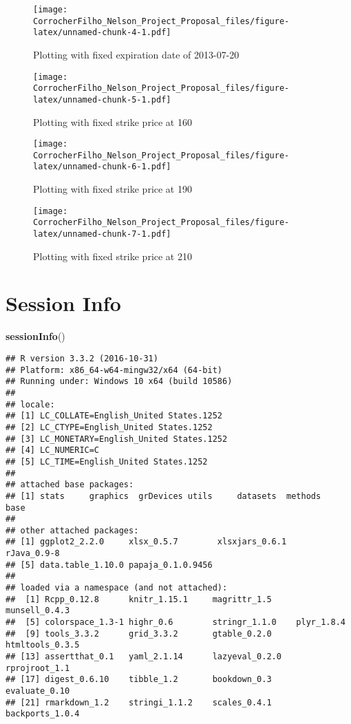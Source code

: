 \documentclass[english,man]{apa6}
\newenvironment{Shaded}{\begin{snugshade}}{\end{snugshade}}
\newcommand{\KeywordTok}[1]{\textcolor[rgb]{0.13,0.29,0.53}{\textbf{{#1}}}}
\newcommand{\NormalTok}[1]{{#1}}
\begin{document}
\begin{figure}[htbp]
\centering
\texttt{[image: CorrocherFilho\_Nelson\_Project\_Proposal\_files/figure-latex/unnamed-chunk-4-1.pdf]}
\caption{\label{fig:unnamed-chunk-4}Plotting with fixed expiration date of
2013-07-20}
\end{figure}

\begin{figure}[htbp]
\centering
\texttt{[image: CorrocherFilho\_Nelson\_Project\_Proposal\_files/figure-latex/unnamed-chunk-5-1.pdf]}
\caption{\label{fig:unnamed-chunk-5}Plotting with fixed strike price at 160}
\end{figure}

\begin{figure}[htbp]
\centering
\texttt{[image: CorrocherFilho\_Nelson\_Project\_Proposal\_files/figure-latex/unnamed-chunk-6-1.pdf]}
\caption{\label{fig:unnamed-chunk-6}Plotting with fixed strike price at 190}
\end{figure}

\begin{figure}[htbp]
\centering
\texttt{[image: CorrocherFilho\_Nelson\_Project\_Proposal\_files/figure-latex/unnamed-chunk-7-1.pdf]}
\caption{\label{fig:unnamed-chunk-7}Plotting with fixed strike price at 210}
\end{figure}

\section{Session Info}\label{session-info}

\begin{Shaded}
\begin{Highlighting}[]
\KeywordTok{sessionInfo}\NormalTok{()}
\end{Highlighting}
\end{Shaded}

\begin{verbatim}
## R version 3.3.2 (2016-10-31)
## Platform: x86_64-w64-mingw32/x64 (64-bit)
## Running under: Windows 10 x64 (build 10586)
## 
## locale:
## [1] LC_COLLATE=English_United States.1252 
## [2] LC_CTYPE=English_United States.1252   
## [3] LC_MONETARY=English_United States.1252
## [4] LC_NUMERIC=C                          
## [5] LC_TIME=English_United States.1252    
## 
## attached base packages:
## [1] stats     graphics  grDevices utils     datasets  methods   base     
## 
## other attached packages:
## [1] ggplot2_2.2.0     xlsx_0.5.7        xlsxjars_0.6.1    rJava_0.9-8      
## [5] data.table_1.10.0 papaja_0.1.0.9456
## 
## loaded via a namespace (and not attached):
##  [1] Rcpp_0.12.8      knitr_1.15.1     magrittr_1.5     munsell_0.4.3   
##  [5] colorspace_1.3-1 highr_0.6        stringr_1.1.0    plyr_1.8.4      
##  [9] tools_3.3.2      grid_3.3.2       gtable_0.2.0     htmltools_0.3.5 
## [13] assertthat_0.1   yaml_2.1.14      lazyeval_0.2.0   rprojroot_1.1   
## [17] digest_0.6.10    tibble_1.2       bookdown_0.3     evaluate_0.10   
## [21] rmarkdown_1.2    stringi_1.1.2    scales_0.4.1     backports_1.0.4
\end{verbatim}
\end{document}
